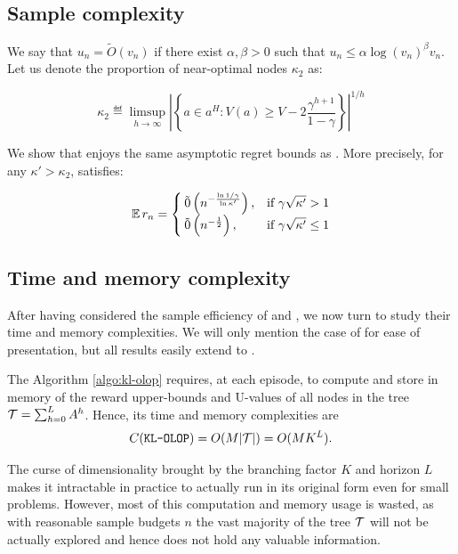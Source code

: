 \subsection{Sample complexity}
\label{sec:sample-complexity}

We say that $u_n = \tilde{O}(v_n)$ if there exist $\alpha, \beta >0$ such that $u_n \leq \alpha \log(v_n)^\beta v_n$.
Let us denote the proportion of near-optimal nodes $\kappa_2$ as:


\begin{equation*}
\label{eq:kappa}
\kappa_2 \eqdef \limsup_{h\rightarrow\infty}{\left|\left\{a\in a^H:V(a) \geq V - 2\frac{\gamma^{h+1}}{1-\gamma}\right\}\right|^{1/h}}
\end{equation*}

\begin{theorem}
	\label{thm:regret}
	We show that \KLOLOP enjoys the same asymptotic regret bounds as \OLOP. More precisely, for any $\kappa' > \kappa_2$, \KLOLOP satisfies:
	
	
	\begin{equation*}
	\expectedvalue r_n = \begin{cases}
	\tilde{0}\left(n^{-\frac{\log 1/\gamma}{\log \kappa'}}\right), & \text{if}\ \gamma\sqrt{\kappa'} > 1 \\
	\tilde{0}\left(n^{-\frac{1}{2}}\right), & \text{if}\ \gamma\sqrt{\kappa'} \leq 1
	\end{cases}
	\end{equation*}
\end{theorem}

\subsection{Time and memory complexity}
\label{sec:time-complexity}

After having considered the sample efficiency of \OLOP and \KLOLOP, we now turn to study their time and memory complexities. We will only mention the case of \KLOLOP for ease of presentation, but all results easily extend to \OLOP.

The Algorithm \ref{algo:kl-olop} requires, at each episode, to compute and store in memory of the reward upper-bounds and U-values of all nodes in the tree $\mathcal{T} = \sum_{h=0}^L A^h$.
Hence, its time and memory complexities are 
\begin{equation}
C(\texttt{KL-OLOP}) = O(M|\mathcal{T}|) = O(MK^L).
\end{equation}

The curse of dimensionality brought by the branching factor $K$ and horizon $L$ makes it intractable in practice to actually run \KLOLOP in its original form even for small problems. However, most of this computation and memory usage is wasted, as with reasonable sample budgets $n$ the vast majority of the tree $\mathcal{T}$ will not be actually explored and hence does not hold any valuable information.

